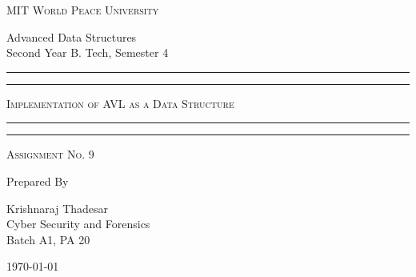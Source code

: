 \documentclass[11pt]{article}
\begin{document}
\begin{titlepage}
    \centering


    \huge\textsc{
        MIT World Peace University
    }\\

    \vspace{0.75\baselineskip} %

    \LARGE{
        Advanced Data Structures\\
        Second Year B. Tech, Semester 4
    }

    \vfill %


    \rule{\textwidth}{1.6pt}\vspace*{-\baselineskip}\vspace*{2pt}
    \rule{\textwidth}{0.6pt}
    \vspace{0.75\baselineskip} %



    \huge{\textsc{
            Implementation of AVL as a Data Structure
        }} \\



    \vspace{0.5\baselineskip} %
    \rule{\textwidth}{0.6pt}\vspace*{-\baselineskip}\vspace*{2.8pt}
    \rule{\textwidth}{1.6pt}

    \vspace{1\baselineskip} %


    \LARGE\textsc{
        Assignment No. 9
    } %
    \vfill


    Prepared By
    \vspace{0.5\baselineskip} %

    \Large{
        Krishnaraj Thadesar \\
        Cyber Security and Forensics\\
        Batch A1, PA 20
    }


    \vspace{0.5\baselineskip} %
    \today

\end{titlepage}
\end{document}
